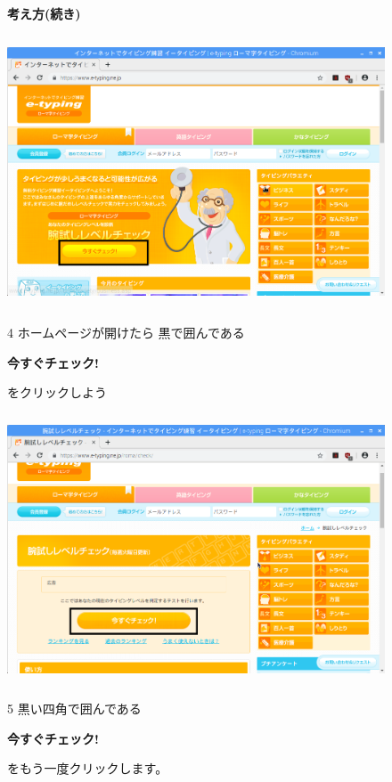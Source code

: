 \documentclass[a4paper,12pt]{jarticle}
\begin{document}
\begin{figure}[t]
\centering



\end{figure}
\clearpage

\begin{figure}
\textbf{考え方(続き)}



\centering

\includegraphics[width=12.294cm,height=8.091cm]{textbook-img087.png}


\begin{minipage}{4.252cm}
4 ホームページが開けたら
黒で囲んである

\textbf{今すぐチェック!}

をクリックしよう

\end{minipage}
\end{figure}





\begin{figure}
\centering
\includegraphics[width=12.162cm,height=8.005cm]{textbook-img088.png}

\begin{minipage}{4.252cm}
5 黒い四角で囲んである

\textbf{今すぐチェック!}

をもう一度クリックします。
\end{minipage}
\end{figure}
\end{document}

